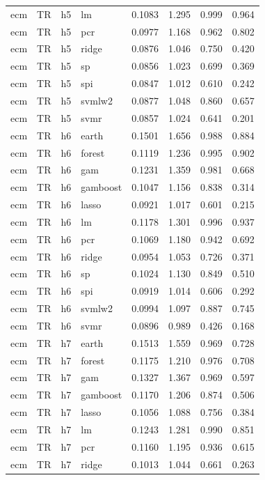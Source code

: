 \begin{ThreePartTable}
\begin{longtable}[t]{llclcccc}
ecm & TR & h5 & lm & 0.1083 & 1.295 & 0.999 & 0.964\\
ecm & TR & h5 & pcr & 0.0977 & 1.168 & 0.962 & 0.802\\
ecm & TR & h5 & ridge & 0.0876 & 1.046 & 0.750 & 0.420\\
ecm & TR & h5 & sp & 0.0856 & 1.023 & 0.699 & 0.369\\
ecm & TR & h5 & spi & 0.0847 & 1.012 & 0.610 & 0.242\\
ecm & TR & h5 & svmlw2 & 0.0877 & 1.048 & 0.860 & 0.657\\
ecm & TR & h5 & svmr & 0.0857 & 1.024 & 0.641 & 0.201\\
\addlinespace
ecm & TR & h6 & earth & 0.1501 & 1.656 & 0.988 & 0.884\\
ecm & TR & h6 & forest & 0.1119 & 1.236 & 0.995 & 0.902\\
ecm & TR & h6 & gam & 0.1231 & 1.359 & 0.981 & 0.668\\
ecm & TR & h6 & gamboost & 0.1047 & 1.156 & 0.838 & 0.314\\
ecm & TR & h6 & lasso & 0.0921 & 1.017 & 0.601 & 0.215\\
ecm & TR & h6 & lm & 0.1178 & 1.301 & 0.996 & 0.937\\
ecm & TR & h6 & pcr & 0.1069 & 1.180 & 0.942 & 0.692\\
ecm & TR & h6 & ridge & 0.0954 & 1.053 & 0.726 & 0.371\\
ecm & TR & h6 & sp & 0.1024 & 1.130 & 0.849 & 0.510\\
ecm & TR & h6 & spi & 0.0919 & 1.014 & 0.606 & 0.292\\
ecm & TR & h6 & svmlw2 & 0.0994 & 1.097 & 0.887 & 0.745\\
ecm & TR & h6 & svmr & 0.0896 & 0.989 & 0.426 & 0.168\\
\addlinespace
ecm & TR & h7 & earth & 0.1513 & 1.559 & 0.969 & 0.728\\
ecm & TR & h7 & forest & 0.1175 & 1.210 & 0.976 & 0.708\\
ecm & TR & h7 & gam & 0.1327 & 1.367 & 0.969 & 0.597\\
ecm & TR & h7 & gamboost & 0.1170 & 1.206 & 0.874 & 0.506\\
ecm & TR & h7 & lasso & 0.1056 & 1.088 & 0.756 & 0.384\\
ecm & TR & h7 & lm & 0.1243 & 1.281 & 0.990 & 0.851\\
ecm & TR & h7 & pcr & 0.1160 & 1.195 & 0.936 & 0.615\\
ecm & TR & h7 & ridge & 0.1013 & 1.044 & 0.661 & 0.263\\

\end{longtable}
\end{ThreePartTable}
